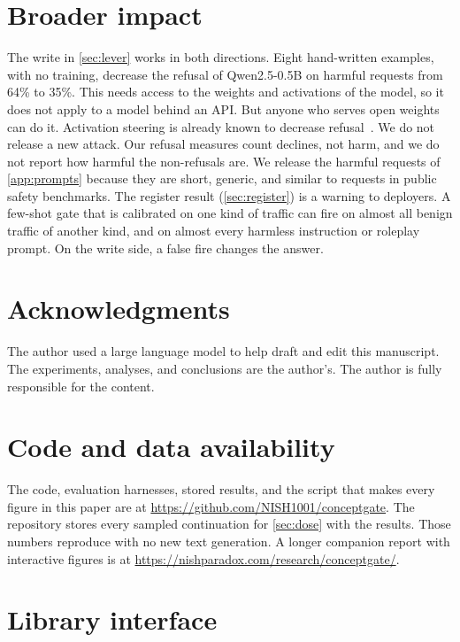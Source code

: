 \documentclass[11pt]{article}
\begin{document}
\section*{Broader impact}
The write in \cref{sec:lever} works in both directions. Eight hand-written examples, with no training,
decrease the refusal of Qwen2.5-0.5B on harmful requests from 64\% to 35\%. This needs access to the
weights and activations of the model, so it does not apply to a model behind an API. But anyone who serves
open weights can do it. Activation steering is already known to decrease
refusal~\citep{arditi2024refusal,korznikov2025roguescalpel}. We do not release a new attack. Our refusal
measures count declines, not harm, and we do not report how harmful the non-refusals are. We release the
harmful requests of \cref{app:prompts} because they are short, generic, and similar to requests in public
safety benchmarks. The register result (\cref{sec:register}) is a warning to deployers. A few-shot gate
that is calibrated on one kind of traffic can fire on almost all benign traffic of another kind, and on
almost every harmless instruction or roleplay prompt. On the write side, a false fire changes the answer.

\section*{Acknowledgments}
The author used a large language model to help draft and edit this manuscript. The experiments, analyses,
and conclusions are the author's. The author is fully responsible for the content.

\section*{Code and data availability}
The code, evaluation harnesses, stored results, and the script that makes every figure in this paper are at
\url{https://github.com/NISH1001/conceptgate}. The repository stores every sampled continuation for
\cref{sec:dose} with the results. Those numbers reproduce with no new text generation. A longer companion
report with interactive figures is at \url{https://nishparadox.com/research/conceptgate/}.




\appendix

\section{Library interface}
\label{app:api}
\end{document}

